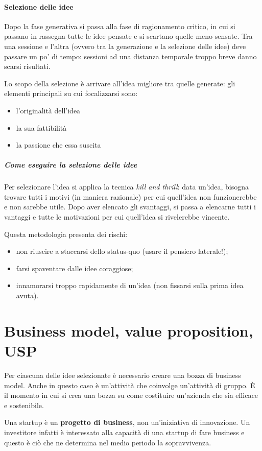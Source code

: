 \paragraph*{Selezione delle idee} Dopo la fase generativa si passa alla fase di
ragionamento critico, in cui si passano in rassegna tutte le idee pensate e si
scartano quelle meno sensate. Tra una sessione e l'altra (ovvero tra la
generazione e la selezione delle idee) deve passare un po' di tempo: sessioni
ad una distanza temporale troppo breve danno scarsi risultati.

Lo scopo della selezione è arrivare all'idea migliore tra quelle generate: gli
elementi principali su cui focalizzarsi sono:
\begin{itemize}
 \item l'originalità dell'idea
 \item la sua fattibilità
 \item la passione che essa suscita
\end{itemize}

\subparagraph*{Come eseguire la selezione delle idee} Per selezionare l'idea si
applica la tecnica \textit{kill and thrill}: data un'idea, bisogna trovare
tutti i motivi (in maniera razionale) per cui quell'idea non funzionerebbe e
non sarebbe utile. Dopo aver elencato gli svantaggi, si passa a elencarne tutti
i vantaggi e tutte le motivazioni per cui quell'idea si rivelerebbe vincente.

\noindent Questa metodologia presenta dei rischi:
\begin{itemize}
 \item non riuscire a staccarsi dello status-quo (usare il pensiero laterale!);
 \item farsi spaventare dalle idee coraggiose;
 \item innamorarsi troppo rapidamente di un'idea (non fissarsi sulla prima idea
avuta).
\end{itemize}

\section{Business model, value proposition, USP}

Per ciascuna delle idee selezionate è necessario creare una bozza di business
model. Anche in questo caso è un'attività che coinvolge un'attività di gruppo. È
il momento in cui si crea una bozza su come costituire un'azienda che sia
efficace e sostenibile.

Una startup è un \textbf{progetto di business}, non un'iniziativa di
innovazione.
Un investitore infatti è interessato alla capacità di una startup di
fare business e questo è ciò che ne determina nel medio periodo la
sopravvivenza.


